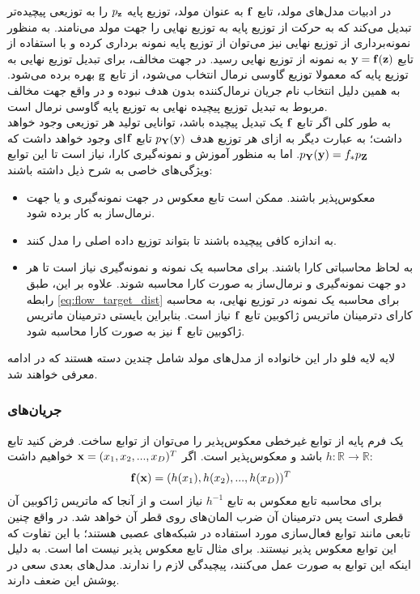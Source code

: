 در ادبیات مدل‌های مولد، تابع $\bf f$ به عنوان مولد، توزیع پایه
$p_{\bf z}$
را به توزیعی پیچیده‌تر تبدیل می‌کند که به حرکت از توزیع پایه به توزیع نهایی را جهت مولد می‌نامند. به منظور نمونه‌برداری از توزیع نهایی نیز می‌توان از توزیع پایه نمونه برداری کرده و با استفاده از تابع
${\bf y} = {\bf f} ( {\bf z} )$
به نمونه از توزیع نهایی رسید. در جهت مخالف، برای تبدیل توزیع نهایی به توزیع پایه که معمولا توزیع گاوسی نرمال انتخاب می‌شود، از تابع $\bf g$ بهره برده می‌شود. به همین دلیل انتخاب نام جریان نرمال‌کننده بدون هدف نبوده و در واقع جهت مخالف مربوط به تبدیل توزیع پیچیده نهایی به توزیع پایه گاوسی نرمال است.
\\
به طور کلی اگر تابع $\bf f$ یک تبدیل پیچیده باشد، توانایی تولید هر توزیعی وجود خواهد داشت؛ به عبارت دیگر به ازای هر توزیع هدف
$ p_{\bf Y}({\bf y})$
تابع $\bf f$ای وجود خواهد داشت که
$ p_{\bf Y}({\bf y}) = f_*p_{\bf Z}$.
اما به منظور آموزش و نمونه‌گیری کارا، نیاز است تا این توابع ویژگی‌های خاصی به شرح ذیل داشته باشند:
\begin{itemize}
	\item
	      معکوس‌پذیر باشند. ممکن است تابع معکوس در جهت نمونه‌گیری و یا جهت نرمال‌ساز به کار برده شود.
	\item
	      به اندازه کافی پیچیده باشند تا بتواند توزیع داده اصلی را مدل کنند.
	\item
	      به لحاظ محاسباتی کارا باشند. برای محاسبه \likelihood{} یک نمونه و نمونه‌گیری نیاز است تا هر دو جهت نمونه‌گیری و نرمال‌ساز به صورت کارا محاسبه شوند. علاوه بر این، طبق رابطه \ref{eq:flow_target_dist} برای محاسبه  \likelihood{} یک نمونه در توزیع نهایی، به محاسبه کارای دترمینان ماتریس ژاکوبین تابع $\bf f$ نیاز است. بنابراین بایستی دترمینان ماتریس ژاکوبین تابع $\bf f$ نیز به صورت کارا محاسبه شود.
\end{itemize}
لایه لایه فلو دار
این خانواده از مدل‌های مولد شامل چندین دسته هستند که در ادامه معرفی خواهند شد.
\subsubsection{جریان‌های
	}
یک فرم پایه از توابع غیرخطی معکوس‌پذیر را می‌توان از توابع \elementwise{} ساخت. فرض کنید تابع
$h: \mathbb{R} \rightarrow \mathbb{R}$
باشد و معکوس‌پذیر است. اگر
${\bf x} = (x_1, x_2, ..., x_D)^T$
خواهیم داشت:
\begin{gather}
	{\bf f}({\bf x}) = (h(x_1), h(x_2), ..., h(x_D))^T
\end{gather}
برای محاسبه تابع معکوس به تابع $h^{-1}$ نیاز است و از آنجا که ماتریس ژاکوبین آن قطری است پس دترمینان آن ضرب المان‌های روی قطر آن خواهد شد. در واقع چنین تابعی مانند توابع فعال‌سازی مورد استفاده در شبکه‌های عصبی هستند؛ با این تفاوت که این توابع معکوس پذیر نیستند. برای مثال تابع  معکوس پذیر نیست اما  است. به دلیل اینکه این توابع به صورت \elementwise{} عمل می‌کنند، پیچیدگی لازم را ندارند. مدل‌های بعدی سعی در پوشش این ضعف دارند.
